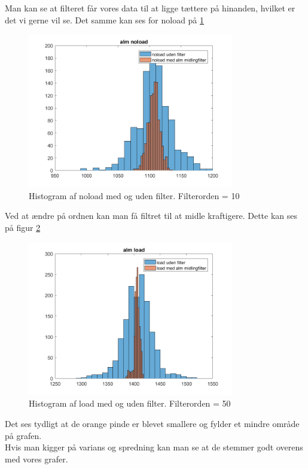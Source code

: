 \documentclass[12pt]{article}
\begin{document}
Man kan se at filteret får vores data til at ligge tættere på hinanden, hvilket er det vi gerne vil se. Det samme kan ses for noload på \ref{fig:histogram2}

\begin{figure}[H]
	\centering
	\includegraphics[width=90mm]{Img/Histogram_noload_L.png}
	\caption{Histogram af noload med og uden filter. Filterorden = 10}
	\label{fig:histogram2}
\end{figure}

Ved at ændre på ordnen kan man få filtret til at midle kraftigere. Dette kan ses på figur \ref{fig:histogram3}

\begin{figure}[H]
	\centering
	\includegraphics[width=90mm]{Img/Histogram_load_50.png}
	\caption{Histogram af load med og uden filter. Filterorden = 50}
	\label{fig:histogram3}
\end{figure}

Det ses tydligt at de orange pinde er blevet smallere og fylder et mindre område på grafen.\\
Hvis man kigger på varians og spredning kan man se at de stemmer godt overens med vores grafer. \\
\end{document}
